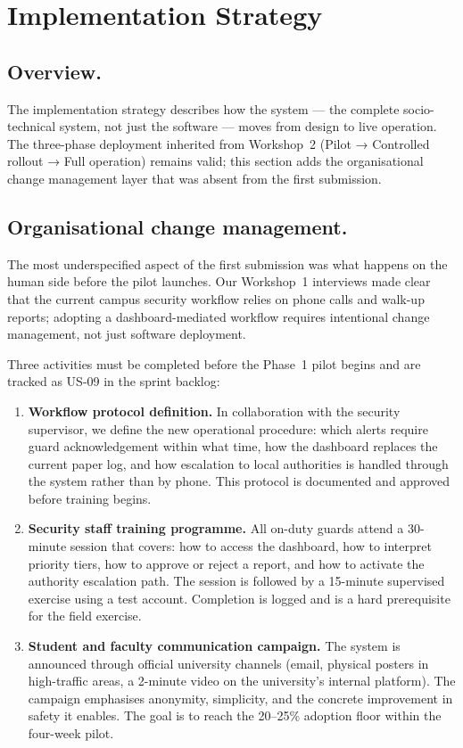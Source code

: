 \documentclass[12pt,a4paper]{article}
\begin{document}
\section{Implementation Strategy}
\label{sec:implementation}

\subsection{Overview.}
The implementation strategy describes how the system --- the
complete socio-technical system, not just the software --- moves
from design to live operation. The three-phase deployment
inherited from Workshop~2 (Pilot → Controlled rollout → Full
operation) remains valid; this section adds the organisational
change management layer that was absent from the first submission.

\subsection{Organisational change management.}
The most underspecified aspect of the first submission was what
happens on the human side before the pilot launches. Our Workshop~1
interviews made clear that the current campus security workflow
relies on phone calls and walk-up reports; adopting a
dashboard-mediated workflow requires intentional change management,
not just software deployment.

Three activities must be completed before the Phase~1 pilot begins
and are tracked as US-09 in the sprint backlog:

\begin{enumerate}
\item \textbf{Workflow protocol definition.} In collaboration with the
  security supervisor, we define the new operational procedure:
  which alerts require guard acknowledgement within what time,
  how the dashboard replaces the current paper log, and how
  escalation to local authorities is handled through the system
  rather than by phone. This protocol is documented and
  approved before training begins.

\item \textbf{Security staff training programme.} All on-duty guards
  attend a 30-minute session that covers: how to access the
  dashboard, how to interpret priority tiers, how to approve
  or reject a report, and how to activate the authority
  escalation path. The session is followed by a 15-minute
  supervised exercise using a test account. Completion is
  logged and is a hard prerequisite for the field exercise.

\item \textbf{Student and faculty communication campaign.}
  The system is announced through official university channels
  (email, physical posters in high-traffic areas, a 2-minute
  video on the university's internal platform). The campaign
  emphasises anonymity, simplicity, and the concrete
  improvement in safety it enables. The goal is to reach the
  20--25\% adoption floor within the four-week pilot.
\end{enumerate}
\end{document}
